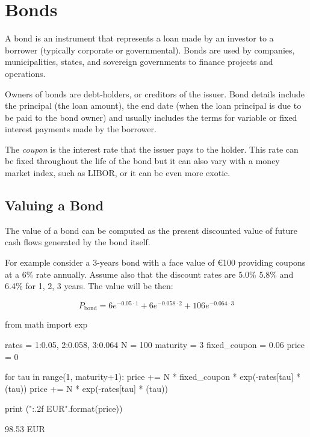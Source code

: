 \chapter{Bonds}
\label{bonds}

A bond is an instrument that represents a loan made by an investor to a borrower (typically corporate or governmental). Bonds are used by companies, municipalities, states, and sovereign governments to finance projects and operations. 

Owners of bonds are debt-holders, or creditors of the issuer. Bond details include the principal (the loan amount), the end date (when the loan principal is due to be paid to the bond owner) and usually includes the terms for variable or fixed interest payments made by the borrower.

The \emph{coupon} is the interest rate that the issuer pays to the holder. This rate can be fixed throughout the life of the bond but it can also vary with a money market index, such as LIBOR, or it can be even more exotic.

\section{Valuing a Bond}
\label{sec:bond_pricing}

The value of a bond can be computed as the present discounted value of future cash flows generated by the bond itself.

For example consider a 3-years bond with a face value of \euro{100} providing coupons at a 6\% rate annually. Assume also that the discount rates are 5.0\% 5.8\% and 6.4\% for 1, 2, 3 years. The value will be then:

\begin{equation*}
P_{\mathrm{bond}}=6e^{-0.05\cdot 1}+6e^{-0.058\cdot 2}+106e^{-0.064\cdot 3}
\end{equation*}

\begin{ipython}
from math import exp

rates = {1:0.05, 2:0.058, 3:0.064}
N = 100
maturity = 3
fixed_coupon = 0.06
price = 0

for tau in range(1, maturity+1):
    price += N * fixed_coupon * exp(-rates[tau] * (tau))
price += N * exp(-rates[tau] * (tau))

print ("{:.2f} EUR".format(price))
\end{ipython}
\begin{ioutput}
98.53 EUR
\end{ioutput}

